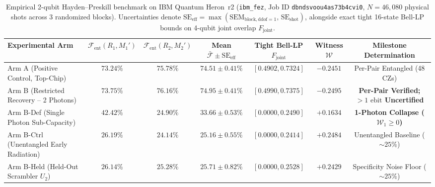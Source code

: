 \documentclass[aps,preprint,superscriptaddress,longbibliography]{revtex4-2}
\begin{document}
\begin{table}[H]
\centering
\caption{Empirical 2-qubit Hayden--Preskill benchmark on IBM Quantum Heron~r2 (\texttt{ibm\_fez}, Job ID \texttt{dbndsvoou4as73b4cvi0}, $N = 46{,}080$ physical shots across 3 randomized blocks). Uncertainties denote $\mathrm{SE}_{\mathrm{eff}} = \max(\mathrm{SEM}_{\mathrm{block,ddof=1}},\, \mathrm{SE}_{\mathrm{shot}})$, alongside exact tight 16-state Bell-LP bounds on 4-qubit joint overlap $F_{\mathrm{joint}}$.}
\label{tab:hp_multiqubit_results}
\begin{tabular}{lcccccc}
\toprule
Experimental Arm & $\mathcal{F}_{\mathrm{ent}}(R_1, M_1')$ & $\mathcal{F}_{\mathrm{ent}}(R_2, M_2')$ & Mean $\bar{\mathcal{F}} \pm \mathrm{SE}_{\mathrm{eff}}$ & Tight Bell-LP $F_{\mathrm{joint}}$ & Witness $\mathcal{W}$ & Milestone Determination \\
\midrule
Arm A (Positive Control, Top-Chip) & $73.24\%$ & $75.78\%$ & $\mathbf{74.51 \pm 0.41\%}$ & $[0.4902, 0.7324]$ & $-0.2451$ & Per-Pair Entangled (48 CZs) \\
Arm B (Restricted Recovery -- 2 Photons) & $73.75\%$ & $76.16\%$ & $\mathbf{74.95 \pm 0.41\%}$ & $\mathbf{[0.4990, 0.7375]}$ & $\mathbf{-0.2495}$ & \textbf{Per-Pair Verified; $>1\text{ ebit}$ Uncertified} \\
Arm B-Def (Single Photon Sub-Capacity) & $42.42\%$ & $24.90\%$ & $33.66 \pm 0.53\%$ & $[0.0000, 0.2490]$ & $+0.1634$ & \textbf{1-Photon Collapse ($\mathcal{W}_1 \ge 0$)} \\
Arm B-Ctrl (Unentangled Early Radiation) & $26.19\%$ & $24.14\%$ & $25.16 \pm 0.55\%$ & $[0.0000, 0.2414]$ & $+0.2484$ & Unentangled Baseline ($\sim 25\%$) \\
Arm B-Held (Held-Out Scrambler $U_2$) & $26.14\%$ & $25.28\%$ & $25.71 \pm 0.82\%$ & $[0.0000, 0.2528]$ & $+0.2429$ & Specificity Noise Floor ($\sim 25\%$) \\
\bottomrule
\end{tabular}
\end{table}
\end{document}
